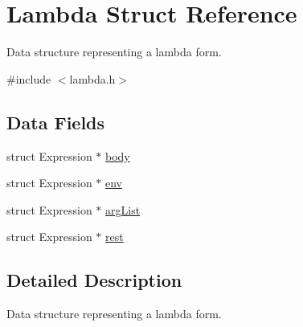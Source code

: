 \hypertarget{structLambda}{\section{Lambda Struct Reference}
\label{structLambda}
}


Data structure representing a lambda form.  




{\ttfamily \#include $<$lambda.\+h$>$}

\subsection*{Data Fields}
\begin{DoxyCompactItemize}
\item 
struct Expression $\ast$ \hyperlink{structLambda_ae1902ae73a4e27fc6955f3446c9437dc}{body}
\item 
struct Expression $\ast$ \hyperlink{structLambda_a398dff8c18b26fe96946ec73481aa16a}{env}
\item 
struct Expression $\ast$ \hyperlink{structLambda_a7f50d0df92708ab9fc9d8c770e9adbaf}{arg\+List}
\item 
struct Expression $\ast$ \hyperlink{structLambda_a8607b673156a25c738c915d315c46c8b}{rest}
\end{DoxyCompactItemize}


\subsection{Detailed Description}
Data structure representing a lambda form. 

